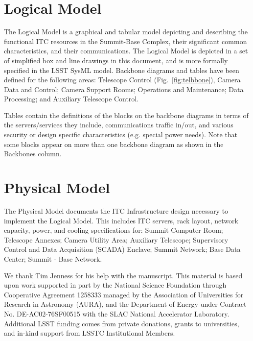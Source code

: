 \documentclass[11pt,twoside]{article}
\begin{document}
\section{Logical Model}


The Logical Model is a graphical and tabular model depicting and describing the functional ITC resources in the Summit-Base Complex, their significant common characteristics, and their communications.
The Logical Model is depicted in a set of simplified box and line drawings in this document, and is more formally specified in the LSST SysML model.
Backbone diagrams and tables have been defined for the following areas: Telescope Control (Fig.~\ref{fig:telbbone}), Camera Data and Control; Camera Support Rooms; Operations and Maintenance; Data Processing; and Auxiliary Telescope Control.

Tables contain the definitions of the blocks on the backbone diagrams in terms of the servers/services they include, communications traffic in/out, and various security or design specific characteristics (e.g. special power needs).
Note that some blocks appear on more than one backbone diagram as shown in the Backbones column.

\section{Physical Model}

The Physical Model documents the ITC Infrastructure design necessary to implement the Logical Model.
This includes ITC servers, rack layout, network capacity, power, and cooling specifications for: Summit Computer Room; Telescope Annexes; Camera Utility Area; Auxiliary Telescope; Supervisory Control and Data Acquisition (SCADA) Enclave; Summit Network; Base Data Center; Summit - Base Network.


\acknowledgements We thank Tim Jenness for his help with the manuscript. This material is based upon work supported in part by the National Science Foundation through Cooperative Agreement 1258333 managed by the Association of Universities for Research in Astronomy (AURA), and the Department of Energy under Contract No. DE-AC02-76SF00515 with the SLAC National Accelerator Laboratory. Additional LSST funding comes from private donations, grants to universities, and in-kind support from LSSTC Institutional Members.

\end{document}
